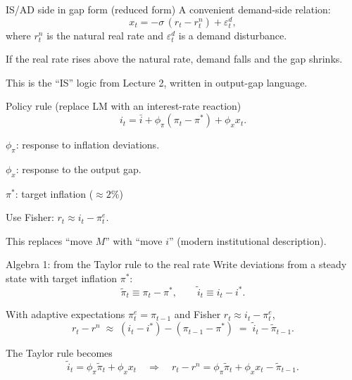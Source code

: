 \documentclass[aspectratio=169,xcolor=dvipsnames]{beamer}
\let\tempone\itemize
\let\temptwo\enditemize
\renewenvironment{itemize}{\tempone\addtolength{\itemsep}{\fill}}{\temptwo}
\begin{document}
\begin{frame}{IS/AD side in gap form (reduced form)}
\small
A convenient demand-side relation:
\[
 x_t = -\sigma\,(r_t - r_t^{n}) + \varepsilon_t^{d},
\]
where $r_t^{n}$ is the natural real rate and $\varepsilon_t^{d}$ is a demand disturbance.

\begin{itemize}
\item If the real rate rises above the natural rate, demand falls and the gap shrinks.
\item This is the ``IS'' logic from Lecture 2, written in output-gap language.
\end{itemize}
\end{frame}

\begin{frame}{Policy rule (replace LM with an interest-rate reaction)}
\small
\[
 i_t = \bar{i} + \phi_{\pi}(\pi_t-\pi^{*}) + \phi_x x_t.
\]

\begin{itemize}
\item $\phi_{\pi}$: response to inflation deviations.
\item $\phi_x$: response to the output gap.
\item $ \pi^{*} $: target inflation ($\approx 2\%$)
\item Use Fisher: $r_t \approx i_t - \pi_t^{e}$.
\end{itemize}

\vspace{0.3em}
\small
This replaces ``move $M$'' with ``move $i$'' (modern institutional description).
\end{frame}

\begin{frame}{Algebra 1: from the Taylor rule to the real rate}
\small
Write deviations from a steady state with target inflation $\pi^{*}$:
\[
\tilde \pi_t \equiv \pi_t-\pi^{*}, \qquad \tilde i_t \equiv i_t-i^{*}.
\]

With adaptive expectations $\pi_t^{e}=\pi_{t-1}$ and Fisher $r_t \approx i_t-\pi_t^{e}$,
\[
r_t-r^{n} \;\approx\; (i_t-i^{*})-(\pi_{t-1}-\pi^{*})
\;=\; \tilde i_t-\tilde \pi_{t-1}.
\]

The Taylor rule becomes
\[
\tilde i_t=\phi_{\pi}\tilde\pi_t+\phi_x x_t
\quad\Rightarrow\quad
r_t-r^{n}=\phi_{\pi}\tilde\pi_t+\phi_x x_t-\tilde\pi_{t-1}.
\]
\end{frame}
\end{document}
